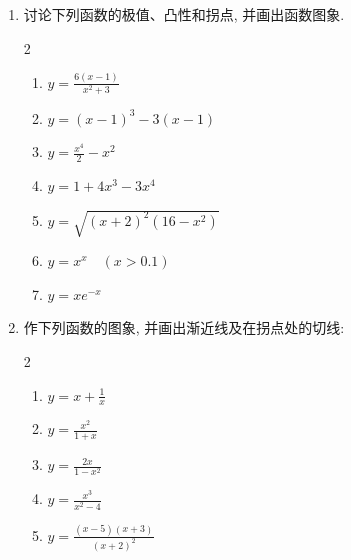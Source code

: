 \begin{ex}
\begin{enumerate}
    \item 讨论下列函数的极值、凸性和拐点, 并画出函数图象.
\begin{multicols}{2}
\begin{enumerate}
\item  $y=\frac{6(x-1)}{x^{2}+3}$
\item  $y=(x-1)^{3}-3(x-1)$
\item  $y=\frac{x^{4}}{2}-x^{2}$
\item  $y=1+4 x^{3}-3 x^{4}$
\item  $y=\sqrt{(x+2)^{2}\left(16-x^{2}\right)}$
\item  $y=x^{x}\quad (x>0.1)$
\item  $y=x e^{-x}$
\end{enumerate}
\end{multicols}

    \item 作下列函数的图象, 并画出渐近线及在拐点处的切线:
    \begin{multicols}{2}
        \begin{enumerate}
            \item $y=x+\frac{1}{x}$
            \item $y=\frac{x^{2}}{1+x}$
            \item $y=\frac{2 x}{1-x^{2}}$
            \item $y=\frac{x^{3}}{x^{2}-4}$
            \item $y=\frac{(x-5)(x+3)}{(x+2)^{2}}$
\end{enumerate}
\end{multicols}
\end{enumerate}
\end{ex}

